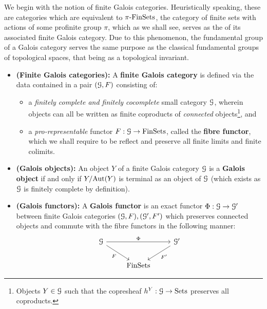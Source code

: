             We begin with the notion of finite Galois categories. Heuristically speaking, these are categories which are equivalent to $\pi\text{-}\mathrm{Fin}\mathrm{Sets}$, the category of finite sets with actions of some profinite group $\pi$, which as we shall see, serves as the  of its associated finite Galois category. Due to this phenomenon, the fundamental group of a Galois category serves the same purpose as the classical fundamental groups of topological spaces, that being as a topological invariant. 
            \begin{definition} \label{def: finite_galois_categories}
                \noindent
                \begin{itemize}
                    \item \textbf{(Finite Galois categories):} A \textbf{finite Galois category} is defined via the data contained in a pair $(\mathcal{G}, F)$ consisting of:
                    \begin{itemize}
                        \item a \textit{finitely complete and finitely cocomplete} small category $\mathcal{G}$, wherein objects can all be written as finite coproducts of \textit{connected} objects\footnote{Objects $Y \in \mathcal{G}$ such that the copresheaf $h^Y: \mathcal{G} \to \mathrm{Sets}$ preserves all coproducts.}, and
                        \item a \textit{pro-representable} functor $F: \mathcal{G} \to \mathrm{Fin}\mathrm{Sets}$, called the \textbf{fibre functor}, which we shall require to be reflect and preserve all finite limits and finite colimits.
                    \end{itemize}
                    \item \textbf{(Galois objects):} An object $Y$ of a finite Galois category $\mathcal{G}$ is a \textbf{Galois object} if and only if $Y/\mathrm{Aut}(Y)$ is terminal as an object of $\mathcal{G}$ (which exists as $\mathcal{G}$ is finitely complete by definition).
                    \item \textbf{(Galois functors):} A \textbf{Galois functor} is an exact functor $\Phi: \mathcal{G} \to \mathcal{G}'$ between finite Galois categories $(\mathcal{G}, F), (\mathcal{G}', F')$ which preserves connected objects and commute with the fibre functors in the following manner:
                        $$
                            \begin{tikzcd}
                            	\calG && {\calG'} \\
                            	& \Fin\Sets
                            	\arrow["F"', from=1-1, to=2-2]
                            	\arrow["{F'}", from=1-3, to=2-2]
                            	\arrow["\Phi", from=1-1, to=1-3]
                            \end{tikzcd}
                        $$
                \end{itemize}
            \end{definition}
